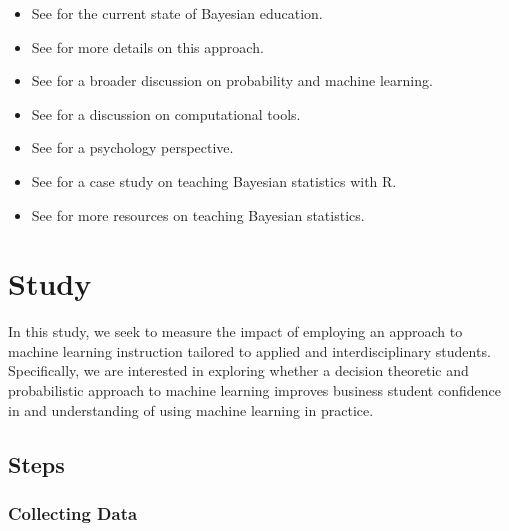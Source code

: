 \documentclass[
  12pt]{article}
\providecommand{\tightlist}{%
  \setlength{\itemsep}{0pt}\setlength{\parskip}{0pt}}
\begin{document}
\begin{itemize}
\tightlist
\item
  See \citet{dogucu_current_2022} for the current state of Bayesian
  education.
\item
  See \citet{murphy_probabilistic_2022} for more details on this
  approach.
\item
  See \citet{dew_probabilistic_2024} for a broader discussion on
  probability and machine learning.
\item
  See \citet{strumbelj_past_2024} for a discussion on computational
  tools.
\item
  See \citet{petrin-pomerleau_bayesian_2023} for a psychology
  perspective.
\item
  See \citet{wang_research_2024} for a case study on teaching Bayesian
  statistics with R.
\item
  See \citet{diluvi_structured_2022} for more resources on teaching
  Bayesian statistics.
\end{itemize}

\section{Study}\label{sec-study}

In this study, we seek to measure the impact of employing an approach to
machine learning instruction tailored to applied and interdisciplinary
students. Specifically, we are interested in exploring whether a
decision theoretic and probabilistic approach to machine learning
improves business student confidence in and understanding of using
machine learning in practice.

\subsection{Steps}\label{steps}

\subsubsection{Collecting Data}\label{collecting-data}
\end{document}
